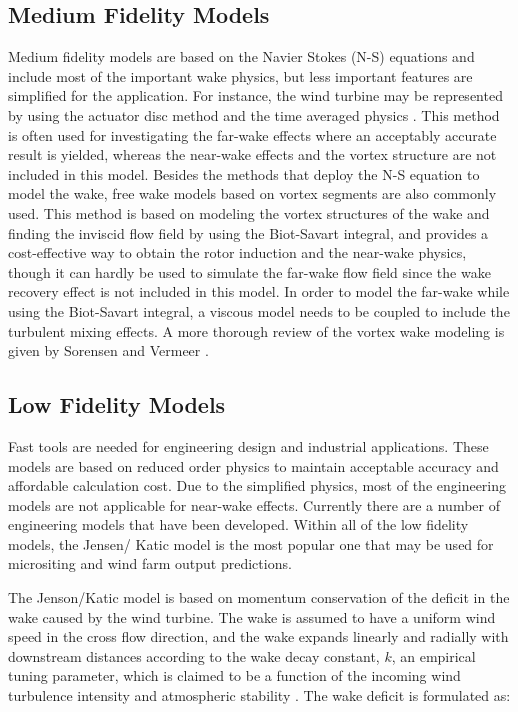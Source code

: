 \documentclass{umthesis}
\begin{document}
\subsection{Medium Fidelity Models}
Medium fidelity models are based on the Navier Stokes (N-S) equations and include most of the important wake physics, but less important features are simplified for the application. For instance, the wind turbine may be represented by using the actuator disc method and the time averaged physics \cite{Mikkelsen_2003}. This method is often used for investigating the far-wake effects where an acceptably accurate result is  yielded, whereas the near-wake effects and the vortex structure are not included in this model. Besides the methods that deploy the N-S equation to model the wake, free wake models based on vortex segments are also commonly used. This method is based on modeling the vortex structures of the wake and finding the inviscid flow field by using the Biot-Savart integral, and provides a cost-effective way to obtain the rotor induction and the near-wake physics, though it can hardly be used to simulate the far-wake flow field since the wake recovery effect is not included in this model. In order to model the far-wake while using the Biot-Savart integral, a viscous model needs to be coupled to include the turbulent mixing effects. A more thorough review of the vortex wake modeling is given by Sorensen\cite{Aerodynamic_aspects} and Vermeer \cite{Vermeer_aerodynamics}.


\subsection{Low Fidelity Models}
Fast tools are needed for engineering design and industrial applications. These models are based on reduced order physics to maintain acceptable accuracy and affordable calculation cost. Due to the simplified physics, most of the engineering models are not applicable for near-wake effects. Currently there are a number of engineering models that have been developed. Within all of the low fidelity models, the Jensen/ Katic model is the most popular one that may be used for micrositing and wind farm output predictions.

The Jenson/Katic model is based on momentum conservation of the deficit in the wake caused by the wind turbine. The wake is assumed to have a uniform wind speed in the cross flow direction, and the wake expands linearly and radially with downstream distances according to the wake decay constant, $k$, an empirical tuning parameter, which is claimed to be a function of the incoming wind turbulence intensity and atmospheric stability \cite{Duckworth_2008}. The wake deficit is formulated as:
\end{document}
